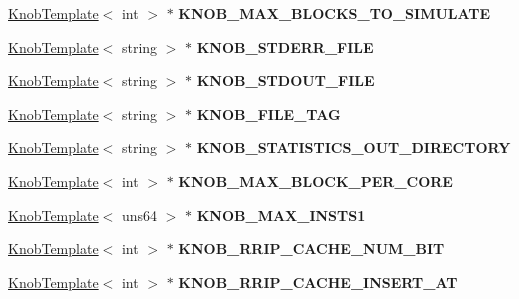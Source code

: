 \begin{DoxyCompactItemize}
\item 
\hypertarget{classall__knobs__c_ad08e1883821465ae473edcdf5122da17}{
\hyperlink{classKnobTemplate}{KnobTemplate}$<$ int $>$ $\ast$ {\bfseries KNOB\_\-MAX\_\-BLOCKS\_\-TO\_\-SIMULATE}}
\label{classall__knobs__c_ad08e1883821465ae473edcdf5122da17}

\item 
\hypertarget{classall__knobs__c_a1ad73dba2b6a57acdb336c6249881f85}{
\hyperlink{classKnobTemplate}{KnobTemplate}$<$ string $>$ $\ast$ {\bfseries KNOB\_\-STDERR\_\-FILE}}
\label{classall__knobs__c_a1ad73dba2b6a57acdb336c6249881f85}

\item 
\hypertarget{classall__knobs__c_acc0254615b5f0cfe4a08965ab3efcf3e}{
\hyperlink{classKnobTemplate}{KnobTemplate}$<$ string $>$ $\ast$ {\bfseries KNOB\_\-STDOUT\_\-FILE}}
\label{classall__knobs__c_acc0254615b5f0cfe4a08965ab3efcf3e}

\item 
\hypertarget{classall__knobs__c_a9fbb37e369defb79af3463341638c260}{
\hyperlink{classKnobTemplate}{KnobTemplate}$<$ string $>$ $\ast$ {\bfseries KNOB\_\-FILE\_\-TAG}}
\label{classall__knobs__c_a9fbb37e369defb79af3463341638c260}

\item 
\hypertarget{classall__knobs__c_afc33b8a1a6c91fac185b4bbcb9838905}{
\hyperlink{classKnobTemplate}{KnobTemplate}$<$ string $>$ $\ast$ {\bfseries KNOB\_\-STATISTICS\_\-OUT\_\-DIRECTORY}}
\label{classall__knobs__c_afc33b8a1a6c91fac185b4bbcb9838905}

\item 
\hypertarget{classall__knobs__c_add24414cf3574cc3be9f5cf5b3483b4c}{
\hyperlink{classKnobTemplate}{KnobTemplate}$<$ int $>$ $\ast$ {\bfseries KNOB\_\-MAX\_\-BLOCK\_\-PER\_\-CORE}}
\label{classall__knobs__c_add24414cf3574cc3be9f5cf5b3483b4c}

\item 
\hypertarget{classall__knobs__c_afc2286ea546b293385dff20fa3fc979c}{
\hyperlink{classKnobTemplate}{KnobTemplate}$<$ uns64 $>$ $\ast$ {\bfseries KNOB\_\-MAX\_\-INSTS1}}
\label{classall__knobs__c_afc2286ea546b293385dff20fa3fc979c}

\item 
\hypertarget{classall__knobs__c_acb5b91dfda356fbc523d1784e6f3e427}{
\hyperlink{classKnobTemplate}{KnobTemplate}$<$ int $>$ $\ast$ {\bfseries KNOB\_\-RRIP\_\-CACHE\_\-NUM\_\-BIT}}
\label{classall__knobs__c_acb5b91dfda356fbc523d1784e6f3e427}

\item 
\hypertarget{classall__knobs__c_a239dd5cb10f809e3c46247b72b203f8b}{
\hyperlink{classKnobTemplate}{KnobTemplate}$<$ int $>$ $\ast$ {\bfseries KNOB\_\-RRIP\_\-CACHE\_\-INSERT\_\-AT}}
\label{classall__knobs__c_a239dd5cb10f809e3c46247b72b203f8b}


\end{DoxyCompactItemize}
